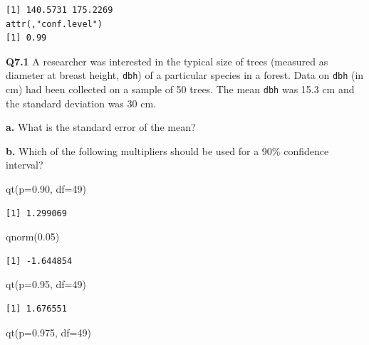 \documentclass[
  oneside]{krantz}
\newenvironment{Shaded}{\begin{snugshade}}{\end{snugshade}}
\newcommand{\AttributeTok}[1]{\textcolor[rgb]{0.77,0.63,0.00}{#1}}
\newcommand{\DecValTok}[1]{\textcolor[rgb]{0.00,0.00,0.81}{#1}}
\newcommand{\FloatTok}[1]{\textcolor[rgb]{0.00,0.00,0.81}{#1}}
\newcommand{\FunctionTok}[1]{\textcolor[rgb]{0.00,0.00,0.00}{#1}}
\newcommand{\NormalTok}[1]{#1}
\begin{document}
\begin{verbatim}
[1] 140.5731 175.2269
attr(,"conf.level")
[1] 0.99
\end{verbatim}

\textbf{Q7.1} A researcher was interested in the typical size of trees (measured as diameter at breast height, \texttt{dbh}) of a particular species in a forest. Data on \texttt{dbh} (in cm) had been collected on a sample of 50 trees. The mean \texttt{dbh} was 15.3 cm and the standard deviation was 30 cm.

\textbf{a.} What is the standard error of the mean?

\textbf{b.} Which of the following multipliers should be used for a 90\% confidence interval?

\begin{Shaded}
\begin{Highlighting}[]
\FunctionTok{qt}\NormalTok{(}\AttributeTok{p=}\FloatTok{0.90}\NormalTok{, }\AttributeTok{df=}\DecValTok{49}\NormalTok{)}
\end{Highlighting}
\end{Shaded}

\begin{verbatim}
[1] 1.299069
\end{verbatim}

\begin{Shaded}
\begin{Highlighting}[]
\FunctionTok{qnorm}\NormalTok{(}\FloatTok{0.05}\NormalTok{)}
\end{Highlighting}
\end{Shaded}

\begin{verbatim}
[1] -1.644854
\end{verbatim}

\begin{Shaded}
\begin{Highlighting}[]
\FunctionTok{qt}\NormalTok{(}\AttributeTok{p=}\FloatTok{0.95}\NormalTok{, }\AttributeTok{df=}\DecValTok{49}\NormalTok{)}
\end{Highlighting}
\end{Shaded}

\begin{verbatim}
[1] 1.676551
\end{verbatim}

\begin{Shaded}
\begin{Highlighting}[]
\FunctionTok{qt}\NormalTok{(}\AttributeTok{p=}\FloatTok{0.975}\NormalTok{, }\AttributeTok{df=}\DecValTok{49}\NormalTok{)}
\end{Highlighting}
\end{Shaded}
\end{document}
